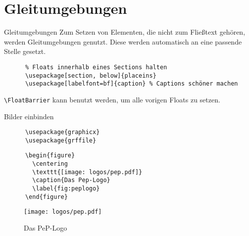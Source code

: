 \section{Gleitumgebungen}

\begin{frame}[fragile]{Gleitumgebungen}
  Zum Setzen von Elementen, die nicht zum Fließtext gehören, werden Gleitumgebungen genutzt.
  Diese werden automatisch an eine passende Stelle gesetzt.

  \begin{Packages}
    \begin{lstlisting}
      % Floats innerhalb eines Sections halten
      \usepackage[section, below]{placeins}
      \usepackage[labelfont=bf]{caption} % Captions schöner machen
    \end{lstlisting}
  \end{Packages}

  \lstinline+\FloatBarrier+ kann benutzt werden, um alle vorigen Floats zu setzen.
\end{frame}

\begin{frame}[fragile]{Bilder einbinden}
  \begin{Packages}
    \begin{lstlisting}
      \usepackage{graphicx}
      \usepackage{grffile}
    \end{lstlisting}
  \end{Packages}
  \begin{CodeExample}{0.60}
    \begin{lstlisting}
      \begin{figure}
        \centering
        \texttt{[image: logos/pep.pdf]}
        \caption{Das Pep-Logo}
        \label{fig:peplogo}
      \end{figure}
    \end{lstlisting}
  \CodeResult
    \begin{figure}
      \centering
      \texttt{[image: logos/pep.pdf]}
      \caption{Das PeP-Logo}
      \label{fig:peplogo}
    \end{figure}
  \end{CodeExample}
\end{frame}
